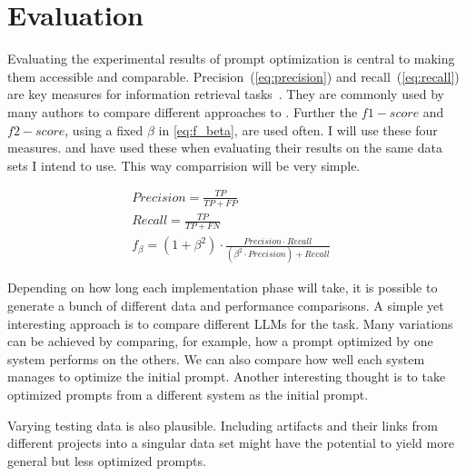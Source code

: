 \section{Evaluation}
\label{approach:sec:evaluation}
 Evaluating the experimental results of prompt optimization is central to making them accessible and comparable. 
 Precision~(\autoref{eq:precision}) and recall~(\autoref{eq:recall}) are key measures for information retrieval tasks~\cite{hayes2006AdvancingCandidate}.
 They are commonly used by many authors to compare different approaches to \TLR. 
 Further the $f1-score$ and $f2-score$, using a fixed $\beta$ in \autoref{eq:f_beta}, are used often.
I will use these four measures.
 and  have used these when evaluating their results on the same data sets I intend to use.
This way comparrision will be very simple.
 


\begin{align}
    \label{eq:precision}
    Precision = \frac{TP}{TP + FP} &\\
    \label{eq:recall}
    Recall = \frac{TP}{TP + FN} &\\
    \label{eq:f_beta}
    f_{\beta} = (1 + \beta^2) \cdot \frac{Precision \cdot Recall}{(\beta^2 \cdot Precision) + Recall}
\end{align}



Depending on how long each implementation phase will take, it is possible to generate a bunch of different data and performance comparisons.
A simple yet interesting approach is to compare different LLMs for the task.
Many variations can be achieved by comparing, for example, how a prompt optimized by one system performs on the others.
We can also compare how well each system manages to optimize the initial prompt.
Another interesting thought is to take optimized prompts from a different system as the initial prompt.

Varying testing data is also plausible.
Including artifacts and their links from different projects into a singular data set might have the potential to yield more general but less optimized prompts.

